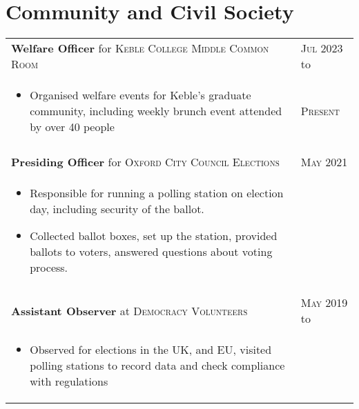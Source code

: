 \documentclass[a4paper,10pt]{article}
\newcommand{\datelen}{1.8cm}
\newcommand{\descrlen}{15.5cm}
\begin{document}
\begin{comment}
  \textsc{Oct 2010} to&Founding member of \textbf{Birmingham Autonomous Robotics Club}\\
  \textsc{Jul 2013}&\footnotesize{Co-founded the club due to interest from computer science faculty and undergraduate students in solving robotics problems and increasing the profile of the field in the school.}\\
\end{tabular}
\end{comment}
\newpage
\section{Community and  Civil Society}
\begin{tabular}{p{\descrlen}|p{\datelen}}
  \textbf{Welfare Officer} for \textsc{Keble College Middle Common Room} & \textsc{Jul 2023} to\\
  \small{
  \vspace{-0.4cm}
  \begin{itemize}
  \item Organised welfare events for Keble's graduate community, including weekly brunch event attended by over 40 people
    \vspace{-0.5cm}
  \end{itemize}}&\textsc{Present}\\\multicolumn{2}{c}{} \\[-0.2cm]
  \textbf{Presiding Officer} for \textsc{Oxford City Council Elections}&\textsc{May 2021}\\
  \small{
  \vspace{-0.4cm}
  \begin{itemize}
  \item Responsible for running a polling station on election day, including security of the ballot.
  \item Collected ballot boxes, set up the station, provided ballots to voters, answered questions about voting process.
    \vspace{-0.5cm}
  \end{itemize}}&\\\multicolumn{2}{c}{} \\[-0.2cm]
  \textbf{Assistant Observer} at \textsc{Democracy Volunteers} & \textsc{May 2019} to\\
  \small{
  \vspace{-0.4cm}
  \begin{itemize}
  \item Observed for elections in the UK, and EU, visited polling stations to record data and check compliance with regulations

\end{itemize}}
\end{tabular}
\end{document}
